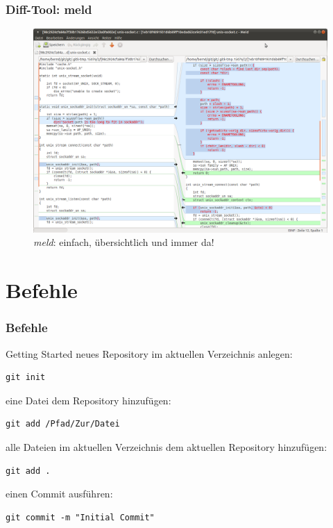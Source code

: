 \documentclass{beamer}
\begin{document}
\begin{frame}\frametitle{Diff-Tool: meld}

\begin{figure}
\includegraphics[scale=0.9]{Bilder/meld} 
\caption{\textit{meld}: einfach, übersichtlich und immer da!}
\end{figure}
\end{frame}


\section{Befehle}

\begin{frame}[fragile]\frametitle{Befehle}
\begin{block} {Getting Started}
neues Repository im aktuellen Verzeichnis anlegen:
\begin{lstlisting}
git init
\end{lstlisting}
%

eine Datei dem Repository hinzufügen:
\begin{lstlisting}
git add /Pfad/Zur/Datei
\end{lstlisting}

alle Dateien im aktuellen Verzeichnis dem aktuellen Repository hinzufügen:
\begin{lstlisting}
git add .
\end{lstlisting}

einen Commit ausführen:
\begin{lstlisting}
git commit -m "Initial Commit"
\end{lstlisting}
\end{block}
\end{frame}
\end{document}
